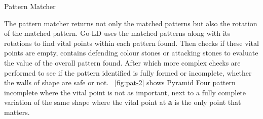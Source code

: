 \documentclass{l4proj}
\newcommand{\bo}[1]{\textbf{#1}}
\begin{document}
\begin{algorithm}[H]
\caption{Pattern Matcher}\label{Pattern Matcher}
    \DontPrintSemicolon
\end{algorithm}

The pattern matcher returns not only the matched patterns but also the rotation of the matched pattern. Go-LD uses the matched patterns along with its rotations to find vital points within each pattern found. Then checks if these vital points are empty, contains defending colour stones or attacking stones to evaluate the value of the overall pattern found. After which more complex checks are performed to see if the pattern identified is fully formed or incomplete, whether the walls of shape are safe or not. ~\autoref{fig:pat-2} shows Pyramid Four pattern incomplete where the vital point is not as important, next to a fully complete variation of the same shape where the vital point at \bo{a} is the only point that matters.
\end{document}
